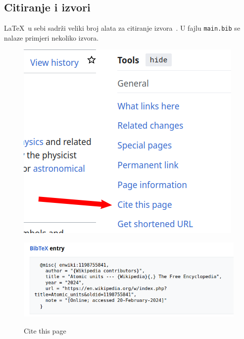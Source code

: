 \subsection{Citiranje i izvori}
\LaTeX~u sebi sadrži veliki broj alata za citiranje izvora~\cite{wiki:latex}.
U fajlu \texttt{main.bib} se nalaze primjeri nekoliko izvora.

\begin{figure}[h]
	\centering
	\begin{minipage}[t]{.3\textwidth}
		\centering
		\includegraphics[width=\linewidth]{images/wikipedia-cite.png}
		\caption{Cite this page}
		\label{fig:wiki-cite}
	\end{minipage}%
	\begin{minipage}[t]{.7\textwidth}
		\centering
		\includegraphics[width=\linewidth]{images/wikipedia-bibtex.png}
		\label{fig:wiki-bib}
	\end{minipage}
\end{figure}


